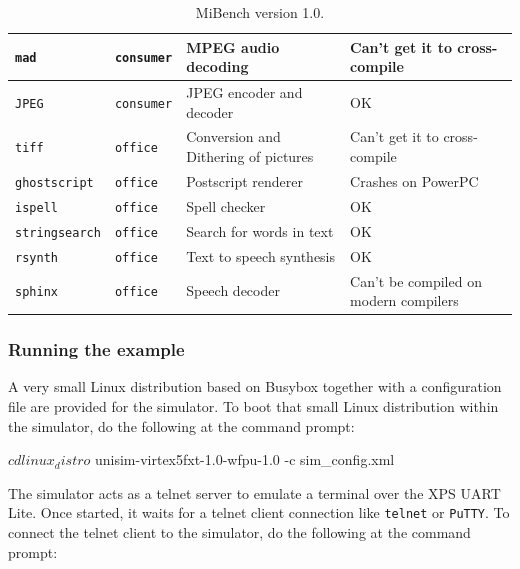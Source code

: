 \begin{table}[p]
\begin{center}
\begin{tabular}{|l|l|p{5cm}|p{5cm}|}
		\texttt{mad} & \texttt{consumer} & MPEG audio decoding & Can't get it to cross-compile \\
		\hline
		\texttt{JPEG} & \texttt{consumer} & JPEG encoder and decoder & OK \\
		\hline
		\texttt{tiff} & \texttt{office} & Conversion and Dithering of pictures & Can't get it to cross-compile \\
		\hline
		\texttt{ghostscript} & \texttt{office} & Postscript renderer & Crashes on PowerPC  \\
		\hline
		\texttt{ispell} & \texttt{office} & Spell checker & OK \\
		\hline
		\texttt{stringsearch} & \texttt{office} & Search for words in text & OK \\
		\hline
		\texttt{rsynth} & \texttt{office} & Text to speech synthesis & OK \\
		\hline
		\texttt{sphinx} & \texttt{office} & Speech decoder & Can't be compiled on modern compilers \\
		\hline
		\end{tabular}
	\end{center}
	\caption{MiBench version 1.0.}
	\label{table:mibench}
\end{table}

\subsubsection{Running the example}
\label{running_a_linux_distro}

A very small Linux distribution based on Busybox together with a configuration file are provided for the simulator.
To boot that small Linux distribution within the simulator, do the following at the command prompt:

\begin{script}
$ cd linux_distro
$ unisim-virtex5fxt-1.0-wfpu-1.0 -c sim_config.xml
\end{script}

The simulator acts as a telnet server to emulate a terminal over the XPS UART Lite. Once started, it waits for a telnet client connection like \texttt{telnet} or \texttt{PuTTY}.
To connect the telnet client to the simulator, do the following at the command prompt:



